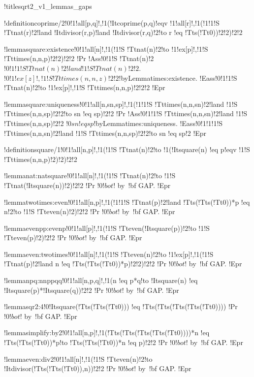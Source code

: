 
!title{sqrt2_v1_lemmas_gaps}

!definition{coprime/2}{!0!1!all[p,q]!,!1(!It{coprime}(p,q)!eqv !1!all[r]!,!1(!1!1!S !Tt{nat}(r)!2!land !It{divisor}(r,p)!land !It{divisor}(r,q)!2!to r !eq !Tt{s}(!Tt{0}))!2!2)!2!2}

!lemma{square:existence}{!0!1!all[n]!,!1(!1!S !Tt{nat}(n)!2!to !1!ex[p]!,!1!S !Tt{times}(n,n,p)!2!2)!2!2}
!Pr{
!Ass{!0!1!S !Tt{nat}(n)!2}
$!0!1!1!S !Tt{nat}(n)!2!land !1!S !Tt{nat}(n)!2!2$.
$!0!1!ex[z]!,!1!S !Tt{times}(n,n,z)!2!2$!by{Lemma}{times:existence}.
!Eass{!0!1!1!S !Tt{nat}(n)!2!to !1!ex[p]!,!1!S !Tt{times}(n,n,p)!2!2!2}}
!Epr

!lemma{square:uniqueness}{!0!1!all[n,sn,sp]!,!1(!1!1!S !Tt{times}(n,n,sn)!2!land !1!S !Tt{times}(n,n,sp)!2!2!to sn !eq sp)!2!2}
!Pr{
!Ass{!0!1!1!S !Tt{times}(n,n,sn)!2!land !1!S !Tt{times}(n,n,sp)!2!2}
$!0sn !eq sp$!by{Lemma}{times:uniqueness}.
!Eass{!0!1!1!1!S !Tt{times}(n,n,sn)!2!land !1!S !Tt{times}(n,n,sp)!2!2!to sn !eq sp!2}}
!Epr

!definition{square/1}{!0!1!all[n,p]!,!1(!1!S !Tt{nat}(n)!2!to !1(!It{square}(n) !eq p!eqv !1!S !Tt{times}(n,n,p)!2)!2)!2!2}

!lemma{nat:natsquare}{!0!1!all[n]!,!1(!1!S !Tt{nat}(n)!2!to !1!S !Tt{nat}(!It{square}(n))!2)!2!2}
!Pr{
$!0!bot$! by~{!bf GAP}.}
!Epr

!lemma{twotimes:even}{!0!1!all[n,p]!,!1(!1!1!S !Tt{nat}(p)!2!land !Tt{s}(!Tt{s}(!Tt{0}))*p !eq n!2!to !1!S !Tt{even}(n)!2)!2!2}
!Pr{
$!0!bot$! by~{!bf GAP}.}
!Epr

!lemma{evenpp:evenp}{!0!1!all[p]!,!1(!1!S !Tt{even}(!It{square}(p))!2!to !1!S !Tt{even}(p)!2)!2!2}
!Pr{
$!0!bot$! by~{!bf GAP}.}
!Epr

!lemma{even:twotimes}{!0!1!all[n]!,!1(!1!S !Tt{even}(n)!2!to !1!ex[p]!,!1(!1!S !Tt{nat}(p)!2!land n !eq !Tt{s}(!Tt{s}(!Tt{0}))*p)!2!2)!2!2}
!Pr{
$!0!bot$! by~{!bf GAP}.}
!Epr

!lemma{npq:nnppqq}{!0!1!all[n,p,q]!,!1(n !eq p*q!to !It{square}(n) !eq !It{square}(p)*!It{square}(q))!2!2}
!Pr{
$!0!bot$! by~{!bf GAP}.}
!Epr

!lemma{sqr2:4}{!0!It{square}(!Tt{s}(!Tt{s}(!Tt{0}))) !eq !Tt{s}(!Tt{s}(!Tt{s}(!Tt{s}(!Tt{0}))))}
!Pr{
$!0!bot$! by~{!bf GAP}.}
!Epr

!lemma{simplify:by2}{!0!1!all[n,p]!,!1(!Tt{s}(!Tt{s}(!Tt{s}(!Tt{s}(!Tt{0}))))*n !eq !Tt{s}(!Tt{s}(!Tt{0}))*p!to !Tt{s}(!Tt{s}(!Tt{0}))*n !eq p)!2!2}
!Pr{
$!0!bot$! by~{!bf GAP}.}
!Epr

!lemma{even:div2}{!0!1!all[n]!,!1(!1!S !Tt{even}(n)!2!to !It{divisor}(!Tt{s}(!Tt{s}(!Tt{0})),n))!2!2}
!Pr{
$!0!bot$! by~{!bf GAP}.}
!Epr

